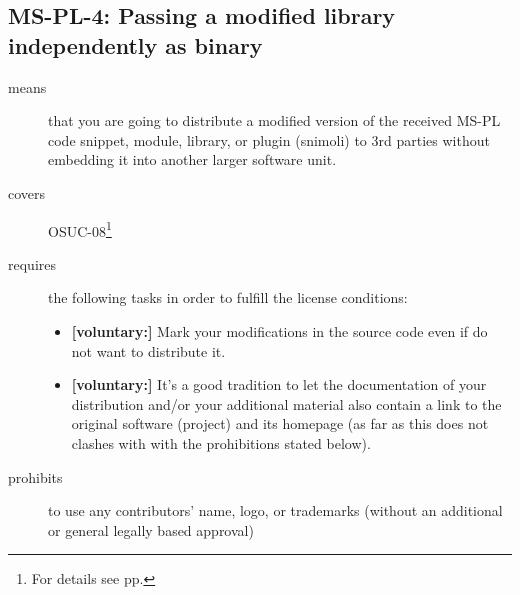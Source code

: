 \subsection{MS-PL-4: Passing a modified library independently as binary}
\label{OSUC-08-MS-PL}
\begin{description}
\item[means] that you are going to distribute a modified version of the received
MS-PL code snippet, module, library, or plugin (snimoli) to 3rd parties without
embedding it into another larger software unit.
\item[covers] OSUC-08\footnote{For details see pp. \pageref{OSUC-08-DEF}}
\item[requires] the following tasks in order to fulfill the license conditions:

\begin{itemize}
  
  \item \textbf{[voluntary:]} Mark your modifications in the source code even if
  do not want to distribute it.
  
  \item \textbf{[voluntary:]} It's a good tradition to let the documentation of
  your distribution and/or your additional material also contain a link to the
  original software (project) and its homepage (as far as this does not clashes
  with with the prohibitions stated below).
    
\end{itemize}

\item[prohibits] to use any contributors' name, logo, or trademarks (without an
additional or general legally based approval)

\end{description}


